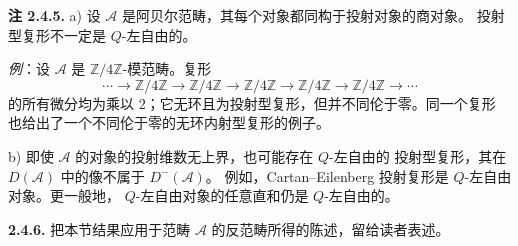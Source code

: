 \clearpage
{}%
\begingroup\small\setlength{\parskip}{0pt}\setlength{\emergencystretch}{1.5em}
\setlength{\abovedisplayskip}{4pt plus 2pt minus 2pt}%
\setlength{\belowdisplayskip}{4pt plus 2pt minus 2pt}%

\noindent\textbf{注 2.4.5.}\quad
a) 设 $\mathcal A$ 是阿贝尔范畴，其每个对象都同构于投射对象的商对象。
投射型复形不一定是 $Q$-左自由的。

\emph{例}：设 $\mathcal A$ 是 $\mathbb Z/4\mathbb Z$-模范畴。复形
\[
\cdots\longrightarrow\mathbb Z/4\mathbb Z
\longrightarrow\mathbb Z/4\mathbb Z
\longrightarrow\mathbb Z/4\mathbb Z
\longrightarrow\mathbb Z/4\mathbb Z
\longrightarrow\mathbb Z/4\mathbb Z\longrightarrow\cdots
\]
的所有微分均为乘以 $2$；它无环且为投射型复形，但并不同伦于零。同一个复形
也给出了一个不同伦于零的无环内射型复形的例子。

b) 即使 $\mathcal A$ 的对象的投射维数无上界，也可能存在 $Q$-左自由的
投射型复形，其在 $D(\mathcal A)$ 中的像不属于 $D^{-}(\mathcal A)$。
例如，Cartan--Eilenberg 投射复形是 $Q$-左自由对象。更一般地，
$Q$-左自由对象的任意直和仍是 $Q$-左自由的。

\medskip\noindent\textbf{2.4.6.}\quad
把本节结果应用于范畴 $\mathcal A$ 的反范畴所得的陈述，留给读者表述。
\endgroup


